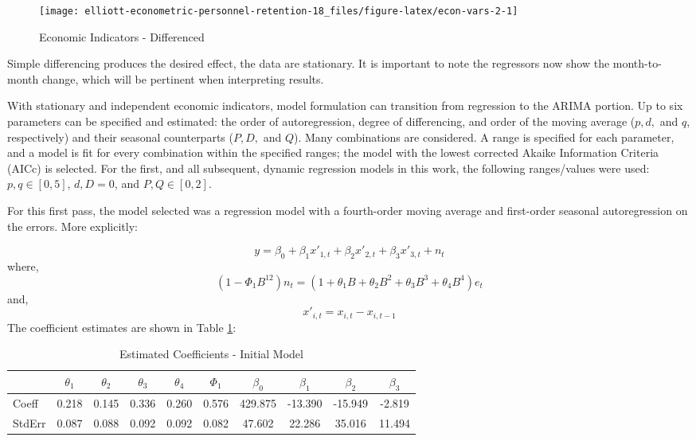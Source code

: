 \documentclass[12pt,letterpaper,toc=flat,oneside]{report}
\theoremstyle{definition}
\theoremstyle{definition}
\theoremstyle{definition}
\theoremstyle{remark}
\begin{document}
\begin{figure}[H]

{\centering \texttt{[image: elliott-econometric-personnel-retention-18\_files/figure-latex/econ-vars-2-1]} 

}

\caption{Economic Indicators - Differenced}\label{fig:econ-vars-2}
\end{figure}

Simple differencing produces the desired effect, the data are
stationary. It is important to note the regressors now show the
month-to-month change, which will be pertinent when interpreting
results.

With stationary and independent economic indicators, model formulation
can transition from regression to the ARIMA portion. Up to six
parameters can be specified and estimated: the order of autoregression,
degree of differencing, and order of the moving average (\(p,d,\) and
\(q\), respectively) and their seasonal counterparts (\(P,D,\) and
\(Q\)). Many combinations are considered. A range is specified for each
parameter, and a model is fit for every combination within the specified
ranges; the model with the lowest corrected Akaike Information Criteria
(AICc) is selected. For the first, and all subsequent, dynamic
regression models in this work, the following ranges/values were used:
\(p,q \in [0,5]\), \(d,D = 0\), and \(P, Q \in [0,2]\).

For this first pass, the model selected was a regression model with a
fourth-order moving average and first-order seasonal autoregression on
the errors. More explicitly:

\[ y = \beta_0 + \beta_1x'_{1,t} + \beta_2x'_{2,t} + \beta_3x'_{3,t} + n_t\]
where,
\[ (1-\Phi_1 B^{12})n_t = (1 + \theta_1B + \theta_2B^2 + \theta_3B^3 + \theta_4 B^4)e_t \]
and, \[ x'_{i,t} = x_{i,t} - x_{i,t-1}\] The coefficient estimates are
shown in Table \ref{tab:dynreg1-coeff}:

\begin{table}[!h]

\caption{\label{tab:dynreg1-coeff}Estimated Coefficients - Initial Model}
\centering
\begin{tabular}[t]{lccccccccc}
\toprule
\bfseries{ } & \bfseries{$\theta_1$} & \bfseries{$\theta_2$} & \bfseries{$\theta_3$} & \bfseries{$\theta_4$} & \bfseries{$\Phi_1$} & \bfseries{$\beta_0$} & \bfseries{$\beta_1$} & \bfseries{$\beta_2$} & \bfseries{$\beta_3$}\\
\midrule
Coeff & 0.218 & 0.145 & 0.336 & 0.260 & 0.576 & 429.875 & -13.390 & -15.949 & -2.819\\
StdErr & 0.087 & 0.088 & 0.092 & 0.092 & 0.082 & 47.602 & 22.286 & 35.016 & 11.494\\
\bottomrule
\end{tabular}
\end{table}
\end{document}
